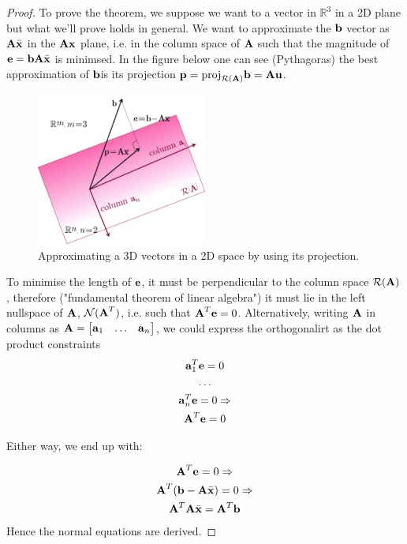 \documentclass[a4paper]{article}
\numberwithin{equation}{section} %
\newcommand{\setR}{\mathbb{R}} %
\newcommand{\fancyN}{\mathcal{N}} %
\newcommand{\fancyR}{\mathcal{R}} %
\newcommand{\B}[1]{\textbf{\textup{#1}}} %
\begin{document}
\begin{proof}
To prove the theorem, we suppose we want to a vector in $\setR^3$ in a 2D plane but what we'll prove holds in general. We want to approximate the $\B{b}$ vector as $\B{A}\bar{\B{x}}$ in the $\B{A}\B{x}$ plane, i.e. in the column space of $\B{A}$ such that the magnitude of $\B{e} = \B{b}\B{A}\bar{\B{x}}$ is minimsed. In the figure below one can see (Pythagoras) the best approximation of $\B{b}$is its projection $\B{p}=\textup{proj}_{\fancyR(\B{A})}\B{b}=\B{A}\B{u}$. 
\begin{figure}[H]
	\centering %
	\includegraphics[height=5cm]{least_sq_proj.png}
    \caption{Approximating a 3D vectors in a 2D space by using its projection.}
    \label{fig:least_sq_proj}
\end{figure}
To minimise the length of $\B{e}$, it must be perpendicular to the column space $\fancyR(\B{A})$, therefore ("fundamental theorem of linear algebra") it must lie in the left nullspace of $\B{A}$, $\fancyN(\B{A}^T)$, i.e. such that $\B{A}^T\B{e}=0$. Alternatively, writing $\B{A}$ in columns as $\B{A}=\begin{bmatrix}\B{a}_1 & \ldots & \B{a}_n \end{bmatrix}$, we could express the orthogonalirt as the dot product constraints
\[
\begin{gathered}
\B{a}_1^T \B{e} = 0 \\
\ldots \\
\B{a}_n^T \B{e} = 0 \Rightarrow\\
\B{A}^T\B{e}=0
\end{gathered}
\]

Either way, we end up with:

\[
\begin{gathered}
\B{A}^T\B{e}=0 \Rightarrow \\
\B{A}^T(\B{b} - \B{A}\bar{\B{x}}) = 0 \Rightarrow \\
\B{A}^T \B{A}\bar{\B{x}} =  \B{A}^T\B{b} 
\end{gathered}
\]
Hence the normal equations are derived.
\end{proof}
\end{document}
